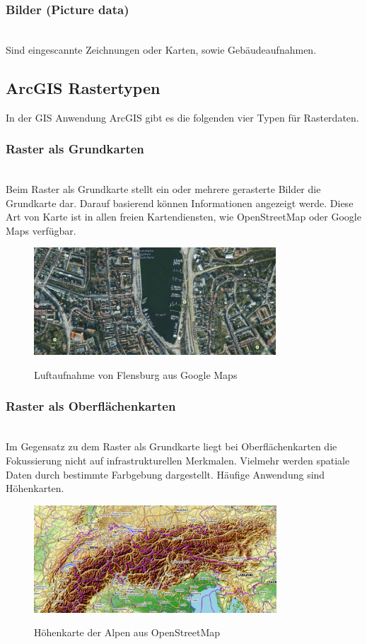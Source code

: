\documentclass[10pt,conference,compsocconf]{IEEEtran}
\begin{document}
\subsubsection{Bilder (Picture data)}\hspace*{\fill} \\
Sind eingescannte Zeichnungen oder Karten, sowie Gebäudeaufnahmen.


\subsection{ArcGIS Rastertypen}
In der GIS Anwendung ArcGIS gibt es die folgenden vier Typen für Rasterdaten.\\

\subsubsection{Raster als Grundkarten}\hspace*{\fill} \\
Beim Raster als Grundkarte stellt ein oder mehrere gerasterte Bilder die Grundkarte dar. Darauf basierend können Informationen angezeigt werde. Diese Art von Karte ist in allen freien Kartendiensten, wie OpenStreetMap oder Google Maps verfügbar.
\begin{figure}[H]
  \centering
  	\includegraphics[height=114pt]{img/gis_Flensburg_raster}\\
  \caption[]{Luftaufnahme von Flensburg aus Google Maps}
  \label{img:gis_Flensburg_raster}
\end{figure}

\subsubsection{Raster als Oberflächenkarten}\hspace*{\fill} \\
Im Gegensatz zu dem Raster als Grundkarte liegt bei Oberflächenkarten die Fokussierung nicht auf infrastrukturellen Merkmalen. Vielmehr werden spatiale Daten durch bestimmte Farbgebung dargestellt. Häufige Anwendung sind Höhenkarten.
\begin{figure}[H]
  \centering
  	\includegraphics[height=114pt]{img/gis_alps}\\
  \caption[]{Höhenkarte der Alpen aus OpenStreetMap}
  \label{img:gis_alps}
\end{figure}
\end{document}
